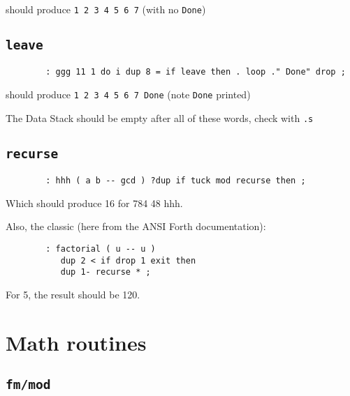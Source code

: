 \noindent should produce \texttt{1 2 3 4 5 6 7} (with no \texttt{Done})


\subsection{\texttt{leave}}

\begin{lstlisting}
        : ggg 11 1 do i dup 8 = if leave then . loop ." Done" drop ; 
\end{lstlisting}

\noindent should produce \texttt{1 2 3 4 5 6 7 Done} (note \texttt{Done} printed)

The Data Stack should be empty after all of these words, check with \texttt{.s}


\subsection{\texttt{recurse}}

\begin{lstlisting}
        : hhh ( a b -- gcd ) ?dup if tuck mod recurse then ;
\end{lstlisting}

\noindent Which should produce 16 for 784 48 hhh. 


Also, the classic (here from the ANSI Forth documentation):

\begin{lstlisting}
        : factorial ( u -- u ) 
           dup 2 < if drop 1 exit then 
           dup 1- recurse * ;
\end{lstlisting}

\noindent For 5, the result should be 120.



\section{Math routines}



\subsection{\texttt{fm/mod}}

